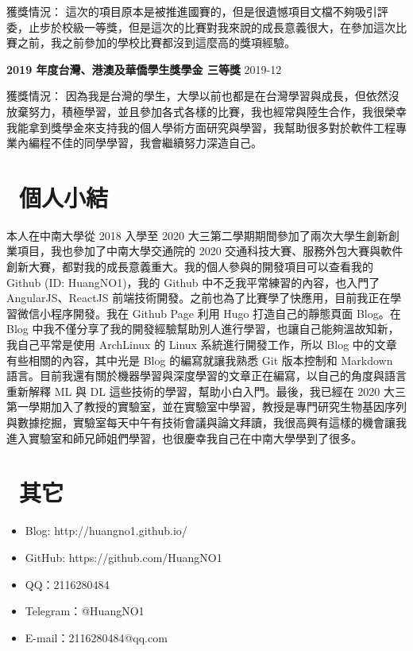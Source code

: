 \documentclass[12pt, a4paper]{article}
\begin{document}
獲獎情況： \quad 這次的項目原本是被推進國賽的，但是很遺憾項目文檔不夠吸引評委，止步於校級一等獎，但是這次的比賽對我來說的成長意義很大，在參加這次比賽之前，我之前參加的學校比賽都沒到這麼高的獎項經驗。

\textbf{2019 年度台灣、港澳及華僑學生獎學金 \quad 三等獎} \hfill 2019-12

獲獎情況： \quad 因為我是台灣的學生，大學以前也都是在台灣學習與成長，但依然沒放棄努力，積極學習，並且參加各式各樣的比賽，我也經常與陸生合作，我很榮幸我能拿到獎學金來支持我的個人學術方面研究與學習，我幫助很多對於軟件工程專業內編程不佳的同學學習，我會繼續努力深造自己。

\section{\color{CVBlue}\faAtlassian\ 個人小結}

本人在中南大學從 2018 入學至 2020 大三第二學期期間參加了兩次大學生創新創業項目，我也參加了中南大學交通院的 2020 交通科技大賽、服務外包大賽與軟件創新大賽，都對我的成長意義重大。我的個人參與的開發項目可以查看我的 Github (ID: HuangNO1)，我的 Github 中不乏我平常練習的內容，也入門了 AngularJS、ReactJS 前端技術開發。之前也為了比賽學了快應用，目前我正在學習微信小程序開發。我在 Github Page 利用 Hugo 打造自己的靜態頁面 Blog。在 Blog 中我不僅分享了我的開發經驗幫助別人進行學習，也讓自己能夠溫故知新，我自己平常是使用 ArchLinux 的 Linux 系統進行開發工作，所以 Blog 中的文章有些相關的內容，其中光是 Blog 的編寫就讓我熟悉 Git 版本控制和 Markdown 語言。目前我還有關於機器學習與深度學習的文章正在編寫，以自己的角度與語言重新解釋 ML 與 DL 這些技術的學習，幫助小白入門。最後，我已經在 2020 大三第一學期加入了教授的實驗室，並在實驗室中學習，教授是專門研究生物基因序列與數據挖掘，實驗室每天中午有技術會議與論文拜讀，我很高興有這樣的機會讓我進入實驗室和師兄師姐們學習，也很慶幸我自己在中南大學學到了很多。 

\section{\color{CVBlue}\faInfo\ 其它}
\begin{itemize}[parsep=0.5ex]
  \item Blog: http://huangno1.github.io/
  \item GitHub: https://github.com/HuangNO1
  \item QQ：2116280484
  \item Telegram：@HuangNO1
  \item E-mail：2116280484@qq.com
\end{itemize}
\end{document}
